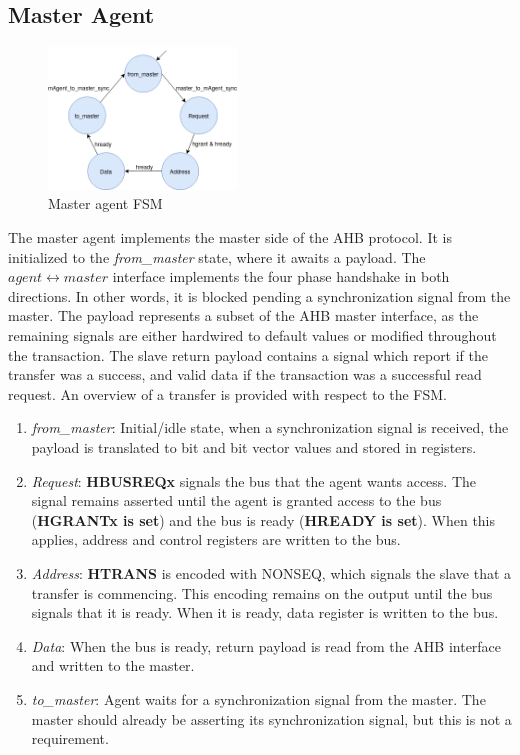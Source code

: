 \newpage
\subsection{Master Agent}
\label{sub:magt-rtl}
\begin{figure}
\includegraphics[width=5cm]{figs/hw/mAgent_FSM.png}
\caption{Master agent FSM}\label{fig:rafsm}
\end{figure}  

The master agent implements the master side of the AHB protocol. It is initialized to the \textit{from\_master} state, where it awaits a payload. The $agent\leftrightarrow master$ interface implements the four phase handshake in both directions. In other words, it is blocked pending a synchronization signal from the master. The payload represents a subset of the AHB master interface, as the remaining signals are either hardwired to default values or modified throughout the transaction. The slave return payload contains a signal which report if the transfer was a success, and valid data if the transaction was a successful read request. An overview of a transfer is provided with respect to the FSM.
\begin{enumerate}
 \item \textit{from\_master}: Initial/idle state, when a synchronization signal is received, the payload is translated to bit and bit vector values and stored in registers.
 \item \textit{Request}: \textbf{HBUSREQx} signals the bus that the agent wants access. The signal remains asserted until the agent is granted access to the bus (\textbf{HGRANTx is set}) and the bus is ready (\textbf{HREADY is set}). When this applies, address and control registers are written to the bus. 
 \item \textit{Address}: \textbf{HTRANS} is encoded with NONSEQ, which signals the slave that a transfer is commencing. This encoding remains on the output until the bus signals that it is ready. When it is ready, data register is written to the bus. 
 \item \textit{Data}: When the bus is ready, return payload is read from the AHB interface and written to the master.
 \item \textit{to\_master}: Agent waits for a synchronization signal from the master. The master should already be asserting its synchronization signal, but this is not a requirement.   
\end{enumerate}

